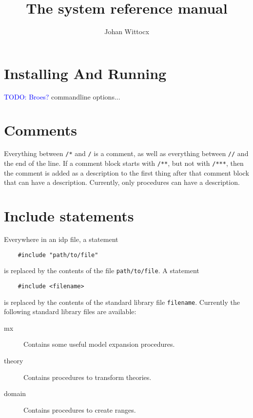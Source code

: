 \documentclass[a4]{article}
\title{The \idp system reference manual}
\author{Johan Wittocx}
\newcommand{\idp}{{\sc idp}\xspace}
\newcommand{\code}[1]{{\tt #1}}
\newcommand{\todo}[1]{\textcolor{blue}{TODO: #1}}
\begin{document}
\maketitle
\setlength{\parindent}{0pt}


\section{Installing And Running}

\todo{Broes?}
commandline options...

\section{Comments}

Everything between \code{/*} and \code{*/} is a comment, as well as everything between \code{//} and the end of the line.  If a comment block starts with \code{/**}, but not with \code{/***}, then the comment is added as a description to the first thing after that comment block that can have a description.  Currently, only procedures can have a description.




\section{Include statements}

Everywhere in an \idp file, a statement 
\begin{lstlisting}
	#include "path/to/file"
\end{lstlisting}
is replaced by the contents of the file \code{path/to/file}.
A statement
\begin{lstlisting}
	#include <filename>
\end{lstlisting}

is replaced by the contents of the standard library file \code{filename}.  Currently the following standard library files are available:
\begin{description}
\item[mx] Contains some useful model expansion procedures.
\item[theory] Contains procedures to transform theories.
\item[domain] Contains procedures to create ranges.
\end{description}
\end{document}
